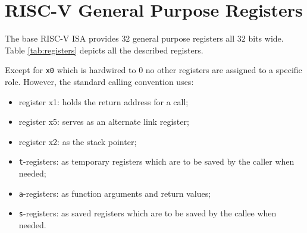 \section{RISC-V General Purpose Registers}
\label{sec:riscv_reg}

The base RISC-V ISA provides $32$ general purpose registers all $32$ bits wide. Table
\ref{tab:registers} depicts all the described registers.

Except for \texttt{x0} which is hardwired to $0$ no other registers are assigned
to a specific role. However, the standard calling convention uses:
\begin{itemize}
  \item register x1: holds the return address for a call;

  \item register x5: serves as an alternate link register;

  \item register x2: as the stack pointer;

  \item \texttt{t}-registers: as temporary registers which are to be saved by the
    caller when needed;

  \item \texttt{a}-registers: as function arguments and return values;

  \item \texttt{s}-registers: as saved registers which are to be saved by the callee
    when needed.
\end{itemize}

